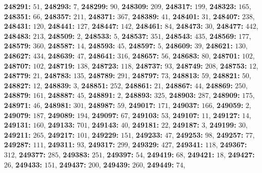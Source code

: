 \textsf{\bfseries 248291:} $51$, \textsf{\bfseries 248293:} $7$, \textsf{\bfseries 248299:} $90$, \textsf{\bfseries 248309:} $209$, \textsf{\bfseries 248317:} $199$, \textsf{\bfseries 248323:} $165$, \textsf{\bfseries 248351:} $66$, \textsf{\bfseries 248357:} $211$, \textsf{\bfseries 248371:} $367$, \textsf{\bfseries 248389:} $41$, \textsf{\bfseries 248401:} $31$, \textsf{\bfseries 248407:} $238$, \textsf{\bfseries 248431:} $120$, \textsf{\bfseries 248441:} $127$, \textsf{\bfseries 248447:} $142$, \textsf{\bfseries 248461:} $84$, \textsf{\bfseries 248473:} $30$, \textsf{\bfseries 248477:} $442$, \textsf{\bfseries 248483:} $213$, \textsf{\bfseries 248509:} $2$, \textsf{\bfseries 248533:} $5$, \textsf{\bfseries 248537:} $351$, \textsf{\bfseries 248543:} $435$, \textsf{\bfseries 248569:} $177$, \textsf{\bfseries 248579:} $360$, \textsf{\bfseries 248587:} $14$, \textsf{\bfseries 248593:} $45$, \textsf{\bfseries 248597:} $5$, \textsf{\bfseries 248609:} $39$, \textsf{\bfseries 248621:} $130$, \textsf{\bfseries 248627:} $434$, \textsf{\bfseries 248639:} $47$, \textsf{\bfseries 248641:} $316$, \textsf{\bfseries 248657:} $56$, \textsf{\bfseries 248683:} $80$, \textsf{\bfseries 248701:} $102$, \textsf{\bfseries 248707:} $102$, \textsf{\bfseries 248719:} $138$, \textsf{\bfseries 248723:} $118$, \textsf{\bfseries 248737:} $93$, \textsf{\bfseries 248749:} $208$, \textsf{\bfseries 248753:} $12$, \textsf{\bfseries 248779:} $21$, \textsf{\bfseries 248783:} $135$, \textsf{\bfseries 248789:} $291$, \textsf{\bfseries 248797:} $73$, \textsf{\bfseries 248813:} $59$, \textsf{\bfseries 248821:} $50$, \textsf{\bfseries 248827:} $12$, \textsf{\bfseries 248839:} $3$, \textsf{\bfseries 248851:} $252$, \textsf{\bfseries 248861:} $21$, \textsf{\bfseries 248867:} $44$, \textsf{\bfseries 248869:} $250$, \textsf{\bfseries 248879:} $161$, \textsf{\bfseries 248887:} $45$, \textsf{\bfseries 248891:} $2$, \textsf{\bfseries 248893:} $325$, \textsf{\bfseries 248903:} $287$, \textsf{\bfseries 248909:} $175$, \textsf{\bfseries 248971:} $46$, \textsf{\bfseries 248981:} $301$, \textsf{\bfseries 248987:} $59$, \textsf{\bfseries 249017:} $171$, \textsf{\bfseries 249037:} $166$, \textsf{\bfseries 249059:} $2$, \textsf{\bfseries 249079:} $187$, \textsf{\bfseries 249089:} $194$, \textsf{\bfseries 249097:} $67$, \textsf{\bfseries 249103:} $53$, \textsf{\bfseries 249107:} $11$, \textsf{\bfseries 249127:} $14$, \textsf{\bfseries 249131:} $160$, \textsf{\bfseries 249133:} $701$, \textsf{\bfseries 249143:} $40$, \textsf{\bfseries 249181:} $22$, \textsf{\bfseries 249187:} $3$, \textsf{\bfseries 249199:} $30$, \textsf{\bfseries 249211:} $265$, \textsf{\bfseries 249217:} $101$, \textsf{\bfseries 249229:} $151$, \textsf{\bfseries 249233:} $47$, \textsf{\bfseries 249253:} $98$, \textsf{\bfseries 249257:} $77$, \textsf{\bfseries 249287:} $111$, \textsf{\bfseries 249311:} $93$, \textsf{\bfseries 249317:} $299$, \textsf{\bfseries 249329:} $427$, \textsf{\bfseries 249341:} $118$, \textsf{\bfseries 249367:} $312$, \textsf{\bfseries 249377:} $285$, \textsf{\bfseries 249383:} $251$, \textsf{\bfseries 249397:} $54$, \textsf{\bfseries 249419:} $68$, \textsf{\bfseries 249421:} $18$, \textsf{\bfseries 249427:} $26$, \textsf{\bfseries 249433:} $151$, \textsf{\bfseries 249437:} $200$, \textsf{\bfseries 249439:} $260$, \textsf{\bfseries 249449:} $74$, 

